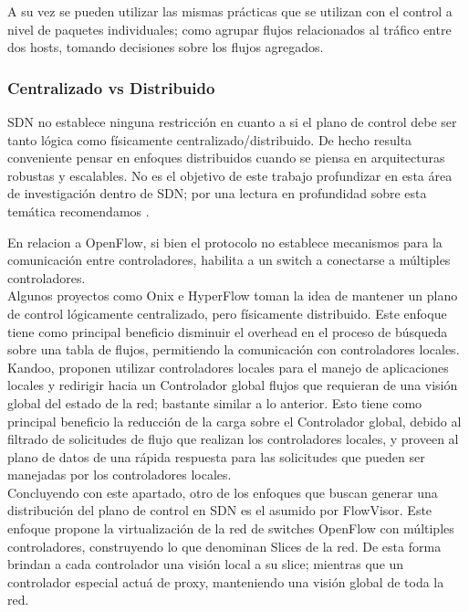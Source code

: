 A su vez se pueden utilizar las mismas prácticas que se utilizan con el control a nivel
de paquetes individuales; como agrupar flujos relacionados al tráfico entre dos hosts, tomando
decisiones sobre los flujos agregados. 

\subsubsection{Centralizado vs Distribuido}
SDN no establece ninguna restricción en cuanto a si el plano de control debe ser tanto lógica como físicamente centralizado/distribuido. De hecho resulta conveniente pensar en enfoques distribuidos cuando se piensa en arquitecturas robustas y escalables. No es el objetivo de este trabajo profundizar en esta área de investigación dentro de SDN; por una lectura en profundidad sobre esta temática recomendamos \cite{heller2012controller}\cite{levin2012logically}. 

En relacion a OpenFlow, si bien el protocolo no establece mecanismos para la comunicación entre controladores, habilita a un switch a conectarse a múltiples controladores.\\

Algunos proyectos como Onix\cite{koponen2014distributed} e HyperFlow\cite{tootoonchian2010hyperflow} toman la idea de mantener un plano de control lógicamente centralizado, pero físicamente distribuido. Este enfoque tiene como principal beneficio disminuir el overhead en el proceso de búsqueda sobre una tabla de flujos, permitiendo la comunicación con controladores locales.\\

Kandoo\cite{hassas2012kandoo}, proponen utilizar controladores locales para el manejo de aplicaciones locales y redirigir hacia un Controlador global flujos que requieran de una visión global del estado de la red; bastante similar a lo anterior. Esto tiene como principal beneficio la reducción de la carga sobre el Controlador global, debido al filtrado de solicitudes de flujo que realizan los controladores locales, y proveen al plano de datos de una rápida respuesta para las solicitudes que pueden ser manejadas por los controladores locales.\\

Concluyendo con este apartado, otro de los enfoques que buscan generar una distribución del plano de control en SDN es el asumido por FlowVisor\cite{sherwood2010carving}. Este enfoque propone la virtualización de la red de switches OpenFlow con múltiples controladores, construyendo lo que denominan Slices de la red. De esta forma brindan a cada controlador una visión local a su slice; mientras que un controlador especial actuá de proxy, manteniendo una visión global de toda la red.


